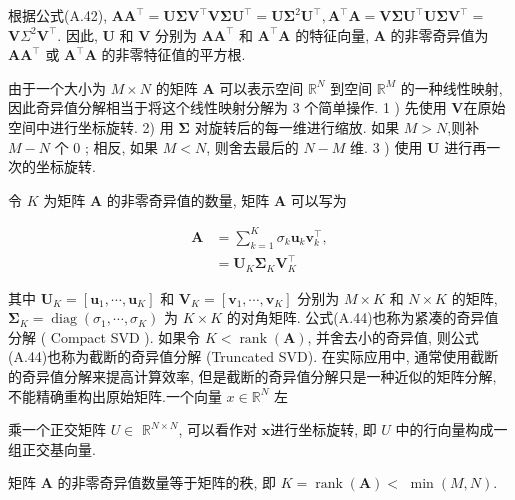 \documentclass[10pt]{article}
\begin{document}
根据公式(A.42), $\boldsymbol{A} \boldsymbol{A}^{\top}=\boldsymbol{U} \boldsymbol{\Sigma} \boldsymbol{V}^{\top} \boldsymbol{V} \boldsymbol{\Sigma} \boldsymbol{U}^{\top}=\boldsymbol{U} \boldsymbol{\Sigma}^{2} \boldsymbol{U}^{\top}, \boldsymbol{A}^{\top} \boldsymbol{A}=\boldsymbol{V} \boldsymbol{\Sigma} \boldsymbol{U}^{\top} \boldsymbol{U} \boldsymbol{\Sigma} \boldsymbol{V}^{\top}=$ $\boldsymbol{V} \Sigma^{2} \boldsymbol{V}^{\top}$. 因此, $\boldsymbol{U}$ 和 $\boldsymbol{V}$ 分别为 $\boldsymbol{A} \boldsymbol{A}^{\top}$ 和 $\boldsymbol{A}^{\top} \boldsymbol{A}$ 的特征向量, $\boldsymbol{A}$ 的非零奇异值为 $\boldsymbol{A} \boldsymbol{A}^{\top}$ 或 $\boldsymbol{A}^{\boldsymbol{\top}} \boldsymbol{A}$ 的非零特征值的平方根.

由于一个大小为 $M \times N$ 的矩阵 $\boldsymbol{A}$ 可以表示空间 $\mathbb{R}^{N}$ 到空间 $\mathbb{R}^{M}$ 的一种线性映射, 因此奇异值分解相当于将这个线性映射分解为 3 个简单操作. 1 ) 先使用 $\boldsymbol{V}$在原始空间中进行坐标旋转. 2) 用 $\boldsymbol{\Sigma}$ 对旋转后的每一维进行缩放. 如果 $M>N$,则补 $M-N$ 个 0 ; 相反, 如果 $M<N$, 则舍去最后的 $N-M$ 维. 3 ) 使用 $\boldsymbol{U}$ 进行再一次的坐标旋转.

令 $K$ 为矩阵 $\boldsymbol{A}$ 的非零奇异值的数量, 矩阵 $\boldsymbol{A}$ 可以写为


\begin{align*}
\boldsymbol{A} & =\sum_{k=1}^{K} \sigma_{k} \boldsymbol{u}_{k} \boldsymbol{v}_{k}^{\top},  \tag{A.43}\\
& =\boldsymbol{U}_{K} \boldsymbol{\Sigma}_{K} \boldsymbol{V}_{K}^{\top} \tag{A.44}
\end{align*}


其中 $\boldsymbol{U}_{K}=\left[\boldsymbol{u}_{1}, \cdots, \boldsymbol{u}_{K}\right]$ 和 $\boldsymbol{V}_{K}=\left[\boldsymbol{v}_{1}, \cdots, \boldsymbol{v}_{K}\right]$ 分别为 $M \times K$ 和 $N \times K$ 的矩阵, $\boldsymbol{\Sigma}_{K}=\operatorname{diag}\left(\sigma_{1}, \cdots, \sigma_{K}\right)$ 为 $K \times K$ 的对角矩阵. 公式(A.44)也称为紧凑的奇异值分解 ( Compact SVD ). 如果令 $K<\operatorname{rank}(\boldsymbol{A})$, 并舍去小的奇异值, 则公式(A.44)也称为截断的奇异值分解 (Truncated SVD). 在实际应用中, 通常使用截断的奇异值分解来提高计算效率, 但是截断的奇异值分解只是一种近似的矩阵分解, 不能精确重构出原始矩阵.一个向量 $x \in \mathbb{R}^{N}$ 左

乘一个正交矩阵 $U \in$ $\mathbb{R}^{N \times N}$, 可以看作对 $\boldsymbol{x}$进行坐标旋转, 即 $U$ 中的行向量构成一组正交基向量.

矩阵 $\boldsymbol{A}$ 的非零奇异值数量等于矩阵的秩, 即 $K=\operatorname{rank}(\boldsymbol{A})<$ $\min (M, N)$.
\end{document}
